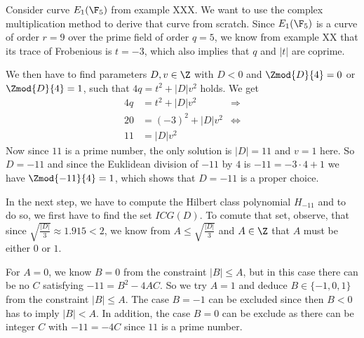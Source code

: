 \begin{example} Consider curve $E_1(\F_5)$ from example XXX. We want to use the complex multiplication method to derive that curve from scratch. Since $E_1(\F_5)$ is a curve of order $r=9$ over the prime field of order $q=5$, we know from example XX that its trace of Frobenious is $t=-3$, which also implies that $q$ and $|t|$ are coprime. 

We then have to find parameters $D,v\in\Z$ with $D<0$ and $\Zmod{D}{4}=0$ or $\Zmod{D}{4}=1$, such that $4q = t^2+ |D|v^2$ holds. We get
\begin{align*}
4q & = t^2+ |D|v^2 & \Rightarrow \\
20 & = (-3)^2 + |D|v^2 & \Leftrightarrow \\
11 & = |D|v^2
\end{align*}
Now since $11$ is a prime number, the only solution is $|D|=11$ and $v=1$ here. So $D=-11$ and since the Euklidean division of $-11$ by $4$ is $-11 = -3\cdot 4 +1$ we have $\Zmod{-11}{4}=1$, which shows that $D=-11$ is a proper choice.

In the next step, we have to compute the Hilbert class polynomial $H_{-11}$ and to do so, we first have to find the set $ICG(D)$. To comute that set, observe, that since $\sqrt{\frac{|D|}{3}}\approx 1.915<2$, we know from $A\leq \sqrt{\frac{|D|}{3}}$ and $A\in\Z$ that $A$ must be either $0$ or $1$. 

For $A=0$, we know $B=0$ from the constraint $|B|\leq A$, but in this case there can be no $C$ satisfying $-11= B^2 -4AC$. So we try $A=1$ and deduce $B\in\{-1,0,1\}$ from the constraint $|B|\leq A$. The case $B=-1$ can be excluded since then $B<0$ has to imply $|B|<A$. In addition, the case $B=0$ can be exclude as there can be integer $C$ with $-11 = -4C$ since $11$ is a prime number. 


\end{example}
